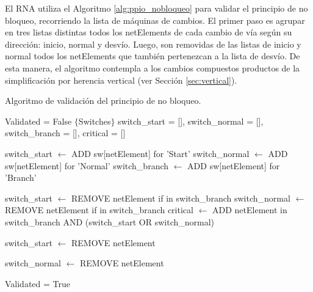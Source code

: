 		El RNA utiliza el Algoritmo \ref{alg:ppio_nobloqueo} para validar el principio de no bloqueo, recorriendo la lista de máquinas de cambios. El primer paso es agrupar en tres listas distintas todos los netElements de cada cambio de vía según su dirección: inicio, normal y desvío. Luego, son removidas de las listas de inicio y normal todos los netElements que también pertenezcan a la lista de desvío. De esta manera, el algoritmo contempla a los cambios compuestos productos de la simplificación por herencia vertical (ver Sección \ref{sec:vertical}). 
		
	
		
		\begin{algorithm}[hbt!]
			\caption{Algoritmo de validación del principio de no bloqueo.}\label{alg:ppio_nobloqueo}
			\DontPrintSemicolon
			\SetNoFillComment
			\LinesNotNumbered 
			Validated = False\;
			$\{$Switches$\}$\;
			switch\_start = [], switch\_normal = [], switch\_branch = [], critical = []\;
			
			
			{
				switch\_start $\leftarrow$ ADD sw[netElement] for 'Start'\;
				switch\_normal $\leftarrow$ ADD sw[netElement] for 'Normal'\;
				switch\_branch $\leftarrow$ ADD sw[netElement] for 'Branch'\;
			}	
			
			{
				switch\_start $\leftarrow$ REMOVE netElement if in switch\_branch\;
				switch\_normal $\leftarrow$ REMOVE netElement if in switch\_branch\;
				critical $\leftarrow$ ADD netElement in switch\_branch AND (switch\_start OR switch\_normal)\;
			}	
			
			{
				{
					switch\_start $\leftarrow$ REMOVE netElement\;
				}
				
				{
					switch\_normal $\leftarrow$ REMOVE netElement\;
				}
			}
			
			{
				Validated = True\;
			}
			
		\end{algorithm}
		
